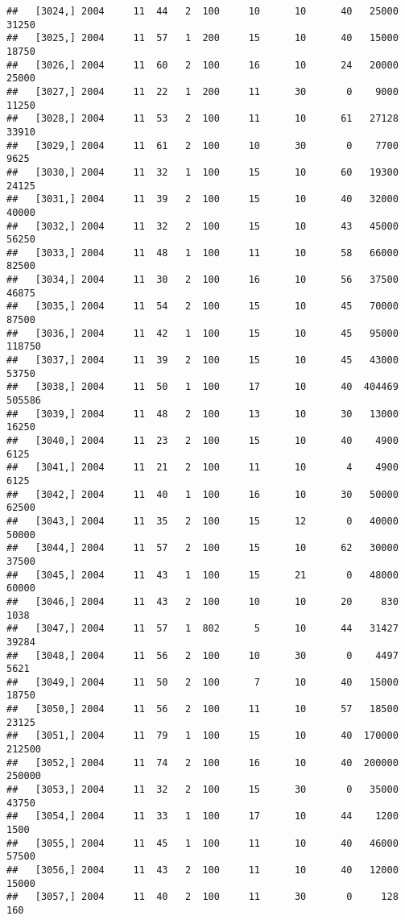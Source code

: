 \documentclass{article}\usepackage[]{graphicx}\usepackage[]{color}
\makeatletter
\newenvironment{kframe}{%
 \def\at@end@of@kframe{}%
 \ifinner\ifhmode%
  \def\at@end@of@kframe{\end{minipage}}%
  \begin{minipage}{\columnwidth}%
 \fi\fi%
 \def\FrameCommand##1{\hskip\@totalleftmargin \hskip-\fboxsep
 \colorbox{shadecolor}{##1}\hskip-\fboxsep
     \hskip-\linewidth \hskip-\@totalleftmargin \hskip\columnwidth}%
 \MakeFramed {\advance\hsize-\width
   \@totalleftmargin\z@ \linewidth\hsize
   \@setminipage}}%
 {\par\unskip\endMakeFramed%
 \at@end@of@kframe}
\newenvironment{knitrout}{}{} %
\makeatother
\begin{document}
\begin{knitrout}
\begin{kframe}
\begin{verbatim}
##   [3024,] 2004     11  44   2  100     10      10      40   25000   31250
##   [3025,] 2004     11  57   1  200     15      10      40   15000   18750
##   [3026,] 2004     11  60   2  100     16      10      24   20000   25000
##   [3027,] 2004     11  22   1  200     11      30       0    9000   11250
##   [3028,] 2004     11  53   2  100     11      10      61   27128   33910
##   [3029,] 2004     11  61   2  100     10      30       0    7700    9625
##   [3030,] 2004     11  32   1  100     15      10      60   19300   24125
##   [3031,] 2004     11  39   2  100     15      10      40   32000   40000
##   [3032,] 2004     11  32   2  100     15      10      43   45000   56250
##   [3033,] 2004     11  48   1  100     11      10      58   66000   82500
##   [3034,] 2004     11  30   2  100     16      10      56   37500   46875
##   [3035,] 2004     11  54   2  100     15      10      45   70000   87500
##   [3036,] 2004     11  42   1  100     15      10      45   95000  118750
##   [3037,] 2004     11  39   2  100     15      10      45   43000   53750
##   [3038,] 2004     11  50   1  100     17      10      40  404469  505586
##   [3039,] 2004     11  48   2  100     13      10      30   13000   16250
##   [3040,] 2004     11  23   2  100     15      10      40    4900    6125
##   [3041,] 2004     11  21   2  100     11      10       4    4900    6125
##   [3042,] 2004     11  40   1  100     16      10      30   50000   62500
##   [3043,] 2004     11  35   2  100     15      12       0   40000   50000
##   [3044,] 2004     11  57   2  100     15      10      62   30000   37500
##   [3045,] 2004     11  43   1  100     15      21       0   48000   60000
##   [3046,] 2004     11  43   2  100     10      10      20     830    1038
##   [3047,] 2004     11  57   1  802      5      10      44   31427   39284
##   [3048,] 2004     11  56   2  100     10      30       0    4497    5621
##   [3049,] 2004     11  50   2  100      7      10      40   15000   18750
##   [3050,] 2004     11  56   2  100     11      10      57   18500   23125
##   [3051,] 2004     11  79   1  100     15      10      40  170000  212500
##   [3052,] 2004     11  74   2  100     16      10      40  200000  250000
##   [3053,] 2004     11  32   2  100     15      30       0   35000   43750
##   [3054,] 2004     11  33   1  100     17      10      44    1200    1500
##   [3055,] 2004     11  45   1  100     11      10      40   46000   57500
##   [3056,] 2004     11  43   2  100     11      10      40   12000   15000
##   [3057,] 2004     11  40   2  100     11      30       0     128     160

\end{verbatim}
\end{kframe}
\end{knitrout}
\end{document}
